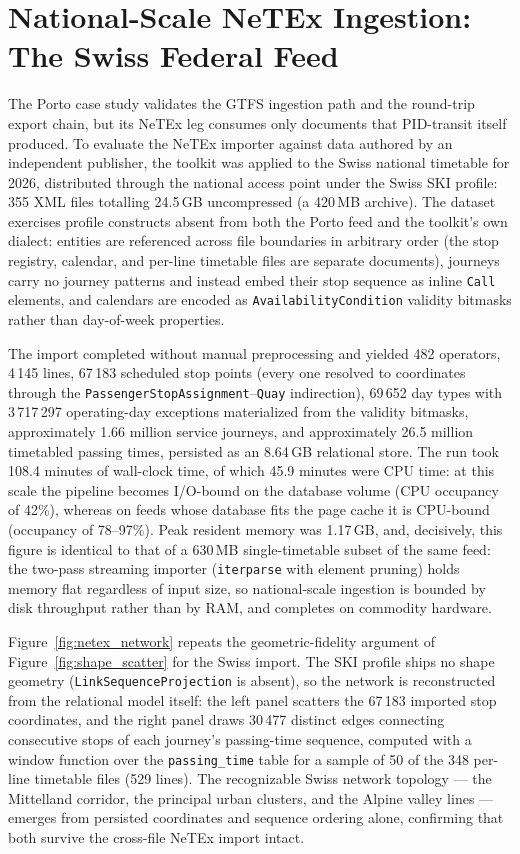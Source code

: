 \section{National-Scale NeTEx Ingestion: The Swiss Federal Feed}
\label{sec:res-netex-scale}

The Porto case study validates the GTFS ingestion path and the round-trip export
chain, but its NeTEx leg consumes only documents that PID-transit itself produced.
To evaluate the NeTEx importer against data authored by an independent publisher,
the toolkit was applied to the Swiss national timetable for 2026, distributed
through the national access point under the Swiss SKI profile: 355 XML files
totalling 24.5\,GB uncompressed (a 420\,MB archive). The dataset exercises
profile constructs absent from both the Porto feed and the toolkit's own dialect:
entities are referenced across file boundaries in arbitrary order (the stop
registry, calendar, and per-line timetable files are separate documents),
journeys carry no journey patterns and instead embed their stop sequence as
inline \texttt{Call} elements, and calendars are encoded as
\texttt{AvailabilityCondition} validity bitmasks rather than day-of-week
properties.

The import completed without manual preprocessing and yielded 482 operators,
4\,145 lines, 67\,183 scheduled stop points (every one resolved to coordinates
through the \texttt{PassengerStopAssignment}--\texttt{Quay} indirection),
69\,652 day types with 3\,717\,297 operating-day exceptions materialized from
the validity bitmasks, approximately 1.66 million service journeys, and
approximately 26.5 million timetabled passing times, persisted as an 8.64\,GB
relational store. The run took 108.4 minutes of wall-clock time, of which 45.9
minutes were CPU time: at this scale the pipeline becomes I/O-bound on the
database volume (CPU occupancy of 42\%), whereas on feeds whose database fits
the page cache it is CPU-bound (occupancy of 78--97\%). Peak resident memory was
1.17\,GB, and, decisively, this figure is identical to that of a 630\,MB
single-timetable subset of the same feed: the two-pass streaming importer
(\texttt{iterparse} with element pruning) holds memory flat regardless of input
size, so national-scale ingestion is bounded by disk throughput rather than by
RAM, and completes on commodity hardware.

Figure~\ref{fig:netex_network} repeats the geometric-fidelity argument of
Figure~\ref{fig:shape_scatter} for the Swiss import. The SKI profile ships no
shape geometry (\texttt{LinkSequenceProjection} is absent), so the network is
reconstructed from the relational model itself: the left panel scatters the
67\,183 imported stop coordinates, and the right panel draws 30\,477 distinct
edges connecting consecutive stops of each journey's passing-time sequence,
computed with a window function over the \texttt{passing\_time} table for a
sample of 50 of the 348 per-line timetable files (529 lines). The recognizable
Swiss network topology --- the Mittelland corridor, the principal urban
clusters, and the Alpine valley lines --- emerges from persisted coordinates and
sequence ordering alone, confirming that both survive the cross-file NeTEx
import intact.

